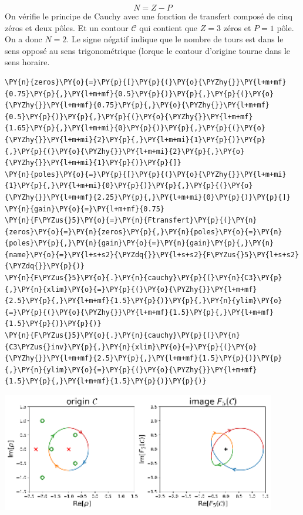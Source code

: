 \[
    N=Z-P
\]
On vérifie le principe de Cauchy avec une fonction de transfert composé
de cinq zéros et deux pôles. Et un contour \(\mathcal{C}\) qui contient 
que \(Z=3\) zéros et \(P=1\) pôle. On a donc \(N=2\). Le signe négatif
indique que le nombre de tours est dans le sens opposé au sens
trigonométrique (lorque le contour d'origine tourne dans le sens
horaire.
\begin{tcolorbox}[breakable, size=fbox, boxrule=1pt, pad at break*=1mm,colback=cellbackground, colframe=cellborder]
\begin{Verbatim}[commandchars=\\\{\}]
\PY{n}{zeros}\PY{o}{=}\PY{p}{[}\PY{p}{(}\PY{o}{\PYZhy{}}\PY{l+m+mf}{0.75}\PY{p}{,}\PY{l+m+mf}{0.5}\PY{p}{)}\PY{p}{,}\PY{p}{(}\PY{o}{\PYZhy{}}\PY{l+m+mf}{0.75}\PY{p}{,}\PY{o}{\PYZhy{}}\PY{l+m+mf}{0.5}\PY{p}{)}\PY{p}{,}\PY{p}{(}\PY{o}{\PYZhy{}}\PY{l+m+mf}{1.65}\PY{p}{,}\PY{l+m+mi}{0}\PY{p}{)}\PY{p}{,}\PY{p}{(}\PY{o}{\PYZhy{}}\PY{l+m+mi}{2}\PY{p}{,}\PY{l+m+mi}{1}\PY{p}{)}\PY{p}{,}\PY{p}{(}\PY{o}{\PYZhy{}}\PY{l+m+mi}{2}\PY{p}{,}\PY{o}{\PYZhy{}}\PY{l+m+mi}{1}\PY{p}{)}\PY{p}{]}
\PY{n}{poles}\PY{o}{=}\PY{p}{[}\PY{p}{(}\PY{o}{\PYZhy{}}\PY{l+m+mi}{1}\PY{p}{,}\PY{l+m+mi}{0}\PY{p}{)}\PY{p}{,}\PY{p}{(}\PY{o}{\PYZhy{}}\PY{l+m+mf}{2.25}\PY{p}{,}\PY{l+m+mi}{0}\PY{p}{)}\PY{p}{]}
\PY{n}{gain}\PY{o}{=}\PY{l+m+mf}{0.75}
\PY{n}{F\PYZus{}5}\PY{o}{=}\PY{n}{Ftransfert}\PY{p}{(}\PY{n}{zeros}\PY{o}{=}\PY{n}{zeros}\PY{p}{,}\PY{n}{poles}\PY{o}{=}\PY{n}{poles}\PY{p}{,}\PY{n}{gain}\PY{o}{=}\PY{n}{gain}\PY{p}{,}\PY{n}{name}\PY{o}{=}\PY{l+s+s2}{\PYZdq{}}\PY{l+s+s2}{F\PYZus{}5}\PY{l+s+s2}{\PYZdq{}}\PY{p}{)}
\PY{n}{F\PYZus{}5}\PY{o}{.}\PY{n}{cauchy}\PY{p}{(}\PY{n}{C3}\PY{p}{,}\PY{n}{xlim}\PY{o}{=}\PY{p}{(}\PY{o}{\PYZhy{}}\PY{l+m+mf}{2.5}\PY{p}{,}\PY{l+m+mf}{1.5}\PY{p}{)}\PY{p}{,}\PY{n}{ylim}\PY{o}{=}\PY{p}{(}\PY{o}{\PYZhy{}}\PY{l+m+mf}{1.5}\PY{p}{,}\PY{l+m+mf}{1.5}\PY{p}{)}\PY{p}{)}
\PY{n}{F\PYZus{}5}\PY{o}{.}\PY{n}{cauchy}\PY{p}{(}\PY{n}{C3\PYZus{}inv}\PY{p}{,}\PY{n}{xlim}\PY{o}{=}\PY{p}{(}\PY{o}{\PYZhy{}}\PY{l+m+mf}{2.5}\PY{p}{,}\PY{l+m+mf}{1.5}\PY{p}{)}\PY{p}{,}\PY{n}{ylim}\PY{o}{=}\PY{p}{(}\PY{o}{\PYZhy{}}\PY{l+m+mf}{1.5}\PY{p}{,}\PY{l+m+mf}{1.5}\PY{p}{)}\PY{p}{)}
\end{Verbatim}
\end{tcolorbox}
\begin{center}
    \includegraphics[width=0.9\textwidth]{notebook/fig/output_46_1.eps}
\end{center}

